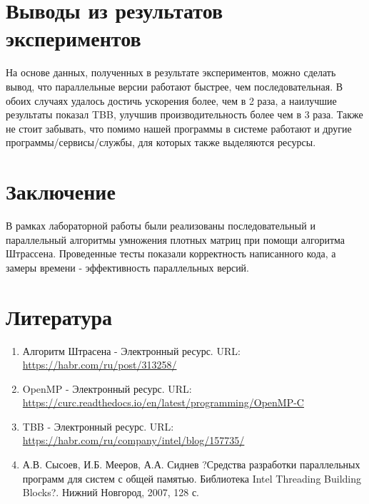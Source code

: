 \documentclass{report}
\begin{document}
\newpage

\section*{Выводы из результатов экспериментов}
На основе данных, полученных в результате экспериментов, можно сделать вывод, что параллельные версии работают быстрее, чем последовательная. В обоих случаях удалось достичь ускорения более, чем в 2 раза, а наилучшие результаты показал TBB, улучшив производительность более чем в 3 раза. Также не стоит забывать, что помимо нашей программы в системе работают и другие программы/сервисы/службы, для которых также выделяются ресурсы.
\newpage

\section*{Заключение}
В рамках лабораторной работы были реализованы последовательный и параллельный алгоритмы умножения плотных матриц при помощи алгоритма Штрассена. Проведенные тесты показали корректность написанного кода, а замеры времени - эффективность параллельных версий.
\newpage

\section*{Литература}
\begin{enumerate}
\item Алгоритм Штрасена - Электронный ресурс. URL: \newline \url{https://habr.com/ru/post/313258/}
\item OpenMP - Электронный ресурс. URL: \newline \url{https://curc.readthedocs.io/en/latest/programming/OpenMP-C}
\item TBB - Электронный ресурс. URL: \newline \url{https://habr.com/ru/company/intel/blog/157735/}
\item А.В. Сысоев, И.Б. Мееров, А.А. Сиднев ?Средства разработки параллельных программ для систем с общей памятью. Библиотека Intel Threading Building Blocks?. Нижний Новгород, 2007, 128 с.
\end{enumerate} 
\newpage

\end{document}
